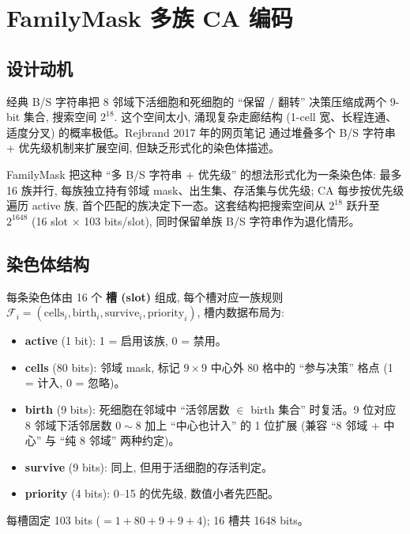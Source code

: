 
\section{FamilyMask 多族 CA 编码}
\label{sec:familymask}

\subsection{设计动机}

经典 B/S 字符串把 8 邻域下活细胞和死细胞的 ``保留 / 翻转'' 决策压缩成两个 9-bit 集合, 搜索空间 $2^{18}$. 这个空间太小, 涌现复杂走廊结构 (1-cell 宽、长程连通、适度分叉) 的概率极低。Rejbrand 2017 年的网页笔记 \cite{rejbrand2017} 通过堆叠多个 B/S 字符串 + 优先级机制来扩展空间, 但缺乏形式化的染色体描述。

FamilyMask 把这种 ``多 B/S 字符串 + 优先级'' 的想法形式化为一条染色体: 最多 16 族并行, 每族独立持有邻域 mask、出生集、存活集与优先级; CA 每步按优先级遍历 active 族, 首个匹配的族决定下一态。这套结构把搜索空间从 $2^{18}$ 跃升至 $2^{1648}$ (16 slot $\times$ 103 bits/slot), 同时保留单族 B/S 字符串作为退化情形。

\subsection{染色体结构}

每条染色体由 16 个 \textbf{槽 (slot)} 组成, 每个槽对应一族规则 $\mathcal{F}_i = (\text{cells}_i, \text{birth}_i, \text{survive}_i, \text{priority}_i)$, 槽内数据布局为:
\begin{itemize}[leftmargin=*, itemsep=0pt, topsep=0pt]
  \item \textbf{active} (1 bit): 1 = 启用该族, 0 = 禁用。
  \item \textbf{cells} (80 bits): 邻域 mask, 标记 $9 \times 9$ 中心外 80 格中的 ``参与决策'' 格点 (1 = 计入, 0 = 忽略)。
  \item \textbf{birth} (9 bits): 死细胞在邻域中 ``活邻居数 $\in$ birth 集合'' 时复活。9 位对应 8 邻域下活邻居数 $0 \sim 8$ 加上 ``中心也计入'' 的 1 位扩展 (兼容 ``8 邻域 + 中心'' 与 ``纯 8 邻域'' 两种约定)。
  \item \textbf{survive} (9 bits): 同上, 但用于活细胞的存活判定。
  \item \textbf{priority} (4 bits): 0--15 的优先级, 数值小者先匹配。
\end{itemize}

每槽固定 103 bits ($= 1 + 80 + 9 + 9 + 4$); 16 槽共 1648 bits。

